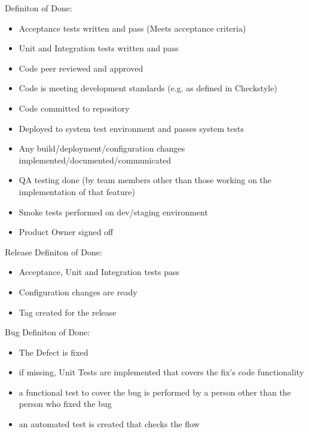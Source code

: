 Definiton of Done:
\begin{itemize}
    \item Acceptance tests written and pass (Meets acceptance criteria)
    \item Unit and Integration tests written and pass
    \item Code peer reviewed and approved
		\item Code is meeting development standards (e.g. as defined in Checkstyle)
    \item Code committed to repository
		\item Deployed to system test environment and passes system tests
		\item Any build/deployment/configuration changes implemented/documented/communicated
    \item QA testing done (by team members other than those working on the implementation of that feature)
		\item Smoke tests performed on dev/staging environment
    \item Product Owner signed off
\end{itemize}

Release Definiton of Done:
\begin{itemize}
    \item Acceptance, Unit and Integration tests pass
    \item Configuration changes are ready
		\item Tag created for the release
\end{itemize}

Bug Definiton of Done:
\begin{itemize}
    \item The Defect is fixed
    \item if missing, Unit Tests are implemented that covers the fix’s code functionality
		\item a functional test to cover the bug is performed by a person other than the person who fixed the bug
		\item an automated test is created that checks the flow
\end{itemize}